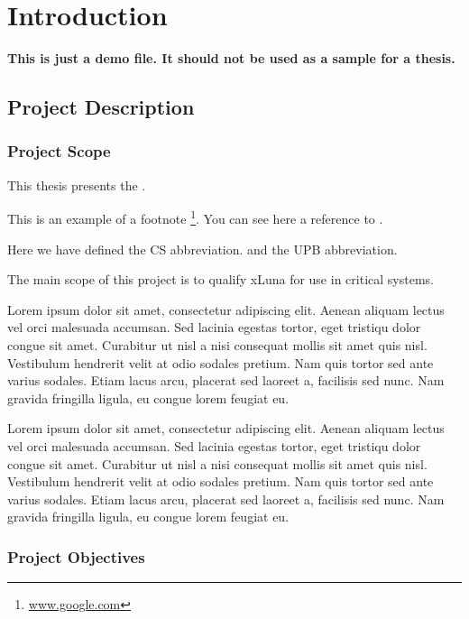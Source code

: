 \chapter{Introduction}
\label{chapter:intro}

\textbf{This is just a demo file. It should not be used as a sample for a thesis.}\\


\section{Project Description}
\label{sec:proj}

\subsection{Project Scope}
\label{sub-sec:proj-scope}

This thesis presents the \textbf{\project}.

This is an example of a footnote \footnote{\url{www.google.com}}. You can see here a reference to .

Here we have defined the CS abbreviation. and the UPB abbreviation.

The main scope of this project is to qualify xLuna for use in critical systems.


Lorem ipsum dolor sit amet, consectetur adipiscing elit. Aenean aliquam lectus vel orci malesuada accumsan. Sed lacinia egestas tortor, eget tristiqu dolor congue sit amet. Curabitur ut nisl a nisi consequat mollis sit amet quis nisl. Vestibulum hendrerit velit at odio sodales pretium. Nam quis tortor sed ante varius sodales. Etiam lacus arcu, placerat sed laoreet a, facilisis sed nunc. Nam gravida fringilla ligula, eu congue lorem feugiat eu.

Lorem ipsum dolor sit amet, consectetur adipiscing elit. Aenean aliquam lectus vel orci malesuada accumsan. Sed lacinia egestas tortor, eget tristiqu dolor congue sit amet. Curabitur ut nisl a nisi consequat mollis sit amet quis nisl. Vestibulum hendrerit velit at odio sodales pretium. Nam quis tortor sed ante varius sodales. Etiam lacus arcu, placerat sed laoreet a, facilisis sed nunc. Nam gravida fringilla ligula, eu congue lorem feugiat eu.


\subsection{Project Objectives}
\label{sub-sec:proj-objectives}

